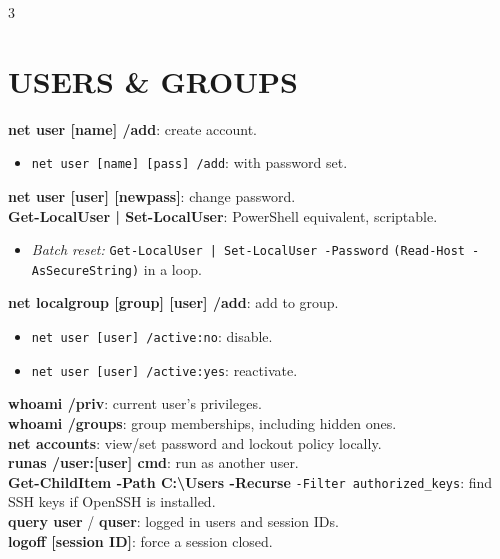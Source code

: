 \documentclass[7pt,landscape]{article}
\begin{document}
\begin{multicols*}{3}
\section{USERS \& GROUPS}
\textbf{net user [name] /add}: create account.
\begin{itemize}
    \item \texttt{net user [name] [pass] /add}: with password set.
\end{itemize}
\textbf{net user [user] [newpass]}: change password. \\
\textbf{Get-LocalUser | Set-LocalUser}: PowerShell equivalent, scriptable.
\begin{itemize}
    \item \textit{Batch reset:} \texttt{Get-LocalUser | Set-LocalUser -Password} \newline \texttt{(Read-Host -AsSecureString)} in a loop.
\end{itemize}
\textbf{net localgroup [group] [user] /add}: add to group.
\begin{itemize}
    \item \texttt{net user [user] /active:no}: disable.
    \item \texttt{net user [user] /active:yes}: reactivate.
\end{itemize}
\textbf{whoami /priv}: current user's privileges. \\
\textbf{whoami /groups}: group memberships, including hidden ones. \\
\textbf{net accounts}: view/set password and lockout policy locally. \\
\textbf{runas /user:[user] cmd}: run as another user. \\
\textbf{Get-ChildItem -Path C:\textbackslash Users -Recurse} \newline \texttt{-Filter authorized\_keys}: find SSH keys if OpenSSH is installed. \\
\textbf{query user} / \textbf{quser}: logged in users and session IDs. \\
\textbf{logoff [session ID]}: force a session closed.


\end{multicols*}
\end{document}
